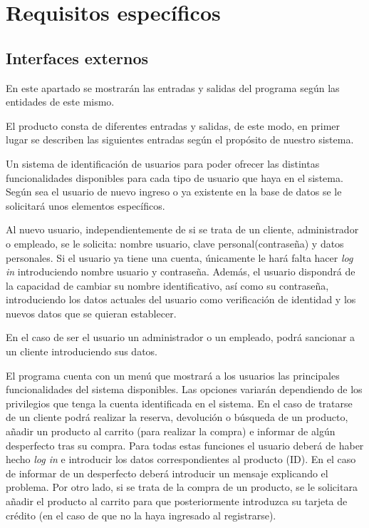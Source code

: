 \section{Requisitos específicos}
\label{sec:req_esp}
\subsection{Interfaces externos}
En este apartado se mostrarán las entradas y salidas del programa según las entidades de este mismo.

El producto consta de diferentes entradas y salidas, de este modo, en primer lugar se describen las siguientes entradas según el propósito de nuestro sistema.

Un sistema de identificación de usuarios para poder ofrecer las distintas funcionalidades disponibles para cada tipo de usuario que haya en el sistema. Según sea el usuario de nuevo ingreso o ya existente en la base de datos se le solicitará unos elementos específicos.

Al nuevo usuario, independientemente de si se trata de un cliente, administrador o empleado, se le solicita: nombre usuario, clave personal(contraseña) y datos personales. Si el usuario ya tiene una cuenta, únicamente le hará falta hacer \textit{log in} introduciendo nombre usuario y contraseña. Además, el usuario dispondrá de la capacidad de cambiar su nombre identificativo, así como su contraseña, introduciendo los datos actuales del usuario como verificación de identidad y los nuevos datos que se quieran establecer.

En el caso de ser el usuario un administrador o un empleado, podrá sancionar a un cliente introduciendo sus datos.

El programa cuenta con un menú que mostrará a los usuarios las principales funcionalidades del sistema disponibles. Las opciones variarán dependiendo de los privilegios que tenga la cuenta identificada en el sistema. En el caso de tratarse de un cliente podrá realizar la reserva, devolución o búsqueda de un producto, añadir un producto al carrito (para realizar la compra) e informar de algún desperfecto tras su compra.
Para todas estas funciones el usuario deberá de haber hecho \textit{log in} e introducir los datos correspondientes al producto (ID). En el caso de informar de un desperfecto deberá introducir un mensaje explicando el problema. Por otro lado, si se trata de la compra de un producto, se le solicitara añadir el producto al carrito para que posteriormente introduzca su tarjeta de crédito (en el caso de que no la haya ingresado al registrarse).

